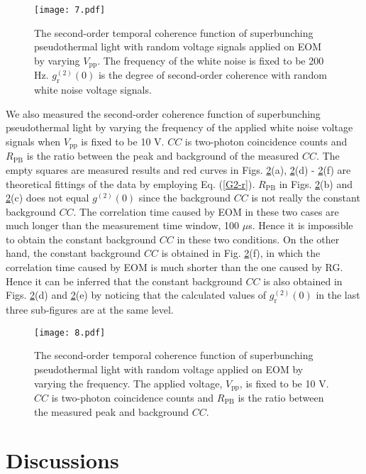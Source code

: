 \documentclass[12pt]{iopart}
\begin{document}
\begin{figure}[htbp]
\centering
\texttt{[image: 7.pdf]}
\caption{The second-order temporal coherence function of superbunching pseudothermal light with random voltage signals applied on EOM by varying $V_{\text{pp}}$. The frequency of the white noise is fixed to be 200 Hz. $g^{(2)}_\text{r}(0)$ is the degree of second-order coherence with random white noise voltage signals.}\label{voltage-r}
\end{figure}

We also measured the second-order coherence function of superbunching pseudothermal light by varying the frequency of the applied white noise voltage signals when $V_{\text{pp}}$ is fixed to be 10 V.  $CC$ is two-photon coincidence counts and $R_{\text{PB}}$ is the ratio between the peak and background of the measured $CC$. The empty squares are measured results and red curves in Figs. \ref{frequency-r}(a), \ref{frequency-r}(d) - \ref{frequency-r}(f) are theoretical fittings of the data by employing Eq. (\ref{G2-r}). $R_{\text{PB}}$ in Figs. \ref{frequency-r}(b) and \ref{frequency-r}(c) does not equal $g^{(2)}(0)$ since the background $CC$ is not really the constant background $CC$. The correlation time caused by EOM in these two cases are much longer than the measurement time window, 100 $\mu$s. Hence it is impossible to obtain the constant background $CC$ in these two conditions. On the other hand, the constant background $CC$ is obtained in Fig. \ref{frequency-r}(f), in which the correlation time caused by EOM is much shorter than the one caused by RG. Hence it can be inferred that the constant background $CC$ is also obtained in Figs. \ref{frequency-r}(d) and \ref{frequency-r}(e) by noticing that the calculated values of $g^{(2)}_\text{r}(0)$ in the last three sub-figures are at the same level.

\begin{figure}[htbp]
\centering
\texttt{[image: 8.pdf]}
\caption{The second-order temporal coherence function of superbunching pseudothermal light with random voltage applied on EOM by varying the frequency. The applied voltage, $V_{\text{pp}}$, is fixed to be 10 V. $CC$ is two-photon coincidence counts and $R_{\text{PB}}$ is the ratio between the measured peak and background $CC$.}\label{frequency-r}
\end{figure}

\section{Discussions}
\end{document}
